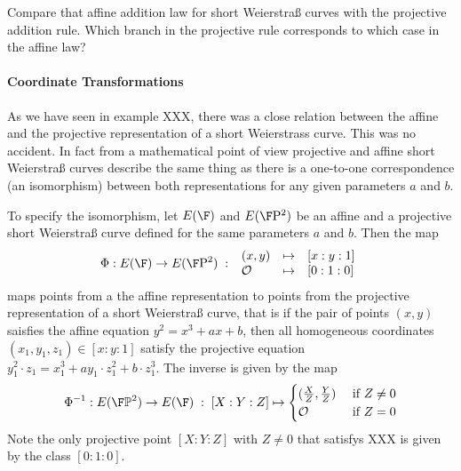 


\begin{exercise}
Compare that affine addition law for short Weierstraß curves with the projective addition rule. Which branch in the projective rule corresponds to which case in the affine law? 
\end{exercise}

\paragraph{Coordinate Transformations} As we have seen in example XXX, there was a close relation between the affine and the projective representation of a short Weierstrass curve. This was no accident.
In fact from a mathematical point of view projective and affine short Weierstraß curves describe the same thing as there is a one-to-one correspondence (an isomorphism) between both representations for any given parameters $a$ and $b$. 

To specify the isomorphism, let $E(\F)$ and $E(\F\mathrm{P}^2)$ be an affine and a projective short Weierstraß curve defined for the same parameters $a$ and $b$. Then the map
\begin{equation}
\Phi : E(\F) \to E(\F\mathrm{P}^2)\;:\;
\begin{array}{lcl}
(x,y)       &\mapsto & [x:y:1]\\
\mathcal{O} &\mapsto & [0:1:0]
\end{array}
\end{equation}
maps points from a the affine representation to points from the projective representation of a short Weierstraß curve, that is if the pair of points $(x,y)$ saisfies the affine equation $y^2= x^3 + ax + b$, then all homogeneous coordinates $(x_1,y_1,z_1)\in [x:y:1]$ satisfy the projective equation $y_1^2\cdot z_1= x_1^3 + ay_1\cdot z_1^2 + b\cdot z_1^3$. The inverse is given by the map
\begin{equation}
\Phi^{-1} : E(\F\mathbb{P}^2)\to E(\F) \;:\; [X:Y:Z] \mapsto \begin{cases}
(\frac{X}{Z},\frac{Y}{Z}) & \text{ if } Z\neq 0\\
\mathcal{O} & \text{ if } Z=0
\end{cases}
\end{equation}
Note the only projective point $[X:Y:Z]$ with $Z\neq 0$ that satisfys XXX is given by the class $[0:1:0]$. 

